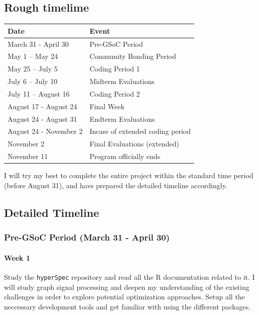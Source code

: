 \documentclass[11pt]{article}
\begin{document}
\hypertarget{rough-timelime}{%
\subsection{Rough timelime}\label{rough-timelime}}

\begin{longtable}[]{@{}ll@{}}
\toprule\noalign{}
Date & Event \\
\midrule\noalign{}
\endhead
\bottomrule\noalign{}
\endlastfoot
March 31 - April 30 & Pre-GSoC Period \\
May 1 -- May 24 & Community Bonding Period \\
May 25 -- July 5 & Coding Period 1 \\
July 6 -- July 10 & Midterm Evaluations \\
July 11 -- August 16 & Coding Period 2 \\
August 17 - August 24 & Final Week \\
August 24 - August 31 & Endterm Evaluations \\
August 24 - November 2 & Incase of extended coding period \\
November 2 & Final Evaluations (extended) \\
November 11 & Program officially ends \\
\end{longtable}

I will try my best to complete the entire project within the standard
time period (before August 31), and have prepared the detailed timeline
accordingly.

\hypertarget{detailed-timeline}{%
\subsection{Detailed Timeline}\label{detailed-timeline}}

\hypertarget{pre-gsoc-period-march-31---april-30}{%
\subsubsection{Pre-GSoC Period (March 31 - April
30)}\label{pre-gsoc-period-march-31---april-30}}

\hypertarget{week-1}{%
\paragraph{Week 1}\label{week-1}}

\hfill\break
Study the \texttt{hyperSpec} repository and read all the R documentation
related to it. I will study graph signal processing and deepen my
understanding of the existing challenges in order to explore potential
optimization approaches. Setup all the neccessary development tools and
get familiar with using the different packages.
\end{document}
